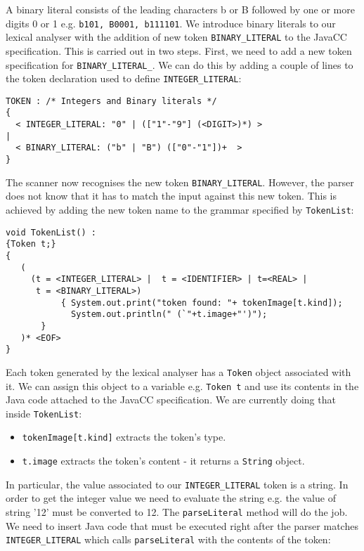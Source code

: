 \documentclass{article}
\begin{document}
A binary literal consists of the leading characters b or B followed by one or more digits 0 or 1 e.g. {\tt b101, B0001, b111101}. We introduce binary literals to our lexical analyser with the addition of new token \verb+BINARY_LITERAL+ to the JavaCC specification. This is carried out in two steps. First, we need to add a new token specification for \verb+BINARY_LITERAL_+. We can do this by adding a couple of lines to the token declaration used to define \verb+INTEGER_LITERAL+:

\begin{verbatim}
TOKEN : /* Integers and Binary literals */
{
  < INTEGER_LITERAL: "0" | (["1"-"9"] (<DIGIT>)*) >
|
  < BINARY_LITERAL: ("b" | "B") (["0"-"1"])+  >
}
\end{verbatim}

The scanner now recognises the new token \verb+BINARY_LITERAL+. However, the parser does not know that it has to match the input against this new token. This is achieved by adding the new token name to the grammar specified by {\tt TokenList}:

\begin{verbatim}
void TokenList() :
{Token t;}
{
   (
     (t = <INTEGER_LITERAL> |  t = <IDENTIFIER> | t=<REAL> |
      t = <BINARY_LITERAL>)
           { System.out.print("token found: "+ tokenImage[t.kind]);
             System.out.println(" (`"+t.image+"')"); 
	   }
   )* <EOF>
}
\end{verbatim}


Each token generated by the lexical analyser has a {\tt Token} object associated with it. We can assign this object to a variable e.g. {\tt Token t} and use its contents in the Java code attached to the JavaCC specification. We are currently doing that inside {\tt TokenList}:
\begin{itemize}
\item \verb+tokenImage[t.kind]+ extracts the token's type.
\item \verb+t.image+ extracts the token's content - it returns a {\tt String} object.
\end{itemize}

In particular, the value associated to our \verb+INTEGER_LITERAL+ token is a string. In order to get the integer value we need to evaluate the string  e.g. the value of string '12' must be converted to 12. The {\tt parseLiteral} method will do the job. We need to insert Java code that must be executed right after the parser matches \verb+INTEGER_LITERAL+ which calls {\tt parseLiteral} with the contents of the token:
\end{document}
